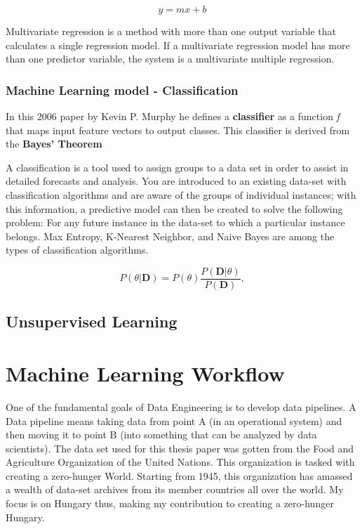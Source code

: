 \begin{equation}
	y = m x + b
\end{equation}

Multivariate regression is a method with more than one output variable that calculates a single regression model. If a multivariate regression model has more than one predictor variable, the system is a multivariate multiple regression.


\subsubsection{Machine Learning model - Classification}

In this 2006 paper by Kevin P. Murphy \cite{murphy2006naive} he defines a \textbf{classifier} as a function \textit{f} that maps input feature vectors to output classes. This classifier is derived from the \textbf{Bayes' Theorem}

A classification is a tool used to assign groups to a data set in order to assist in detailed forecasts and analysis. You are introduced to an existing data-set with classification algorithms and are aware of the groups of individual instances; with this information, a predictive model can then be created to solve the following problem: For any future instance in the data-set to which a particular instance belongs. Max Entropy, K-Nearest Neighbor, and Naive Bayes are among the types of classification algorithms.



\begin{equation}
	\label{eq:bayes}
	P(\theta | \textbf{D}) = P(\theta ) \frac{P(\textbf{D} |\theta)}{P(\textbf{D})},
\end{equation}



\subsection{Unsupervised Learning}



\section{Machine Learning Workflow}
One of the fundamental goals of Data Engineering is to develop data pipelines. A Data pipeline means taking data from point A (in an operational system) and then moving it to point B (into something that can be analyzed by data scientists).
The data set used for this thesis paper was gotten from the Food and Agriculture Organization of the United Nations. This organization is tasked with creating a zero-hunger World. Starting from 1945, this organization has amassed a wealth of data-set archives from its member countries all over the world. My focus is on Hungary thus, making my contribution to creating a zero-hunger Hungary.

